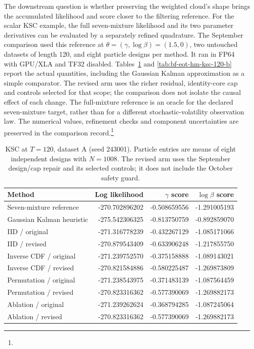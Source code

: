 The downstream question is whether preserving the weighted cloud's shape
brings the accumulated likelihood and score closer to the filtering reference.
For the scalar KSC example, the full seven-mixture likelihood and its two
parameter derivatives can be evaluated by a separately refined quadrature.
The September comparison used this reference at
\(\theta=(\gamma,\log\beta)=(1.5,0)\), two untouched datasets of length 120,
and eight particle designs per method.  It ran in FP64 with GPU/XLA and TF32
disabled.  Tables~\ref{tab:bf-eot-hm-ksc-120-a} and
\ref{tab:bf-eot-hm-ksc-120-b} report the actual quantities, including the
Gaussian Kalman approximation as a simple comparator.  The revised arm uses
the richer residual, identity-core cap and controls selected for that scope;
the comparison does not isolate the causal effect of each change.
The full-mixture reference is an oracle for the declared seven-mixture target,
rather than for a different stochastic-volatility observation law.
The numerical values, refinement checks and component uncertainties are
preserved in the comparison record.\footnote{}

\begin{table}[htbp]
\centering
\small
\setlength{\tabcolsep}{5pt}
\begin{tabular}{lrrr}
\toprule
Method & Log likelihood & \(\gamma\) score & \(\log\beta\) score\\
\midrule
Seven-mixture reference & -270.702896202 & -0.508659556 & -1.291005193\\
Gaussian Kalman heuristic & -275.542306325 & -0.813750759 & -0.892859070\\
IID / original & -271.316778239 & -0.432267129 & -1.085171066\\
IID / revised & -270.879543409 & -0.633906248 & -1.217855750\\
Inverse CDF / original & -271.239752570 & -0.375158888 & -1.089143021\\
Inverse CDF / revised & -270.821584886 & -0.580225487 & -1.269873809\\
Permutation / original & -271.238543975 & -0.371483139 & -1.087564459\\
Permutation / revised & -270.823316362 & -0.577390069 & -1.269882173\\
Ablation / original & -271.239262624 & -0.368794285 & -1.087245064\\
Ablation / revised & -270.823316362 & -0.577390069 & -1.269882173\\
\bottomrule
\end{tabular}
\caption{KSC at \(T=120\), dataset A (seed 243001).
Particle entries are means of eight independent designs with \(N=1008\).
The revised arm uses the September design/cap repair and its selected controls;
it does not include the October safety guard.}
\label{tab:bf-eot-hm-ksc-120-a}
\end{table}

